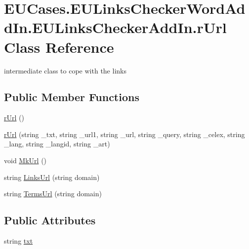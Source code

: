 \hypertarget{class_e_u_cases_1_1_e_u_links_checker_word_add_in_1_1_e_u_links_checker_add_in_1_1r_url}{\section{E\+U\+Cases.\+E\+U\+Links\+Checker\+Word\+Add\+In.\+E\+U\+Links\+Checker\+Add\+In.\+r\+Url Class Reference}
\label{class_e_u_cases_1_1_e_u_links_checker_word_add_in_1_1_e_u_links_checker_add_in_1_1r_url}
}


intermediate class to cope with the links  


\subsection*{Public Member Functions}
\begin{DoxyCompactItemize}
\item 
\hyperlink{class_e_u_cases_1_1_e_u_links_checker_word_add_in_1_1_e_u_links_checker_add_in_1_1r_url_a6ef738c877d82dde9364d29a1fd4087f}{r\+Url} ()
\item 
\hyperlink{class_e_u_cases_1_1_e_u_links_checker_word_add_in_1_1_e_u_links_checker_add_in_1_1r_url_a580cd303bcdb34d8230c37b81e971cfa}{r\+Url} (string \+\_\+txt, string \+\_\+url1, string \+\_\+url, string \+\_\+query, string \+\_\+celex, string \+\_\+lang, string \+\_\+langid, string \+\_\+art)
\item 
void \hyperlink{class_e_u_cases_1_1_e_u_links_checker_word_add_in_1_1_e_u_links_checker_add_in_1_1r_url_ac19eff0c4d6fe4dedb2f062324248340}{Mk\+Url} ()
\item 
string \hyperlink{class_e_u_cases_1_1_e_u_links_checker_word_add_in_1_1_e_u_links_checker_add_in_1_1r_url_a81a72ef87c9b1598e11fc6b0e6d3b41b}{Links\+Url} (string domain)
\item 
string \hyperlink{class_e_u_cases_1_1_e_u_links_checker_word_add_in_1_1_e_u_links_checker_add_in_1_1r_url_a99a9835efe43f2ef82a14742d03e6b0e}{Terms\+Url} (string domain)
\end{DoxyCompactItemize}
\subsection*{Public Attributes}
\begin{DoxyCompactItemize}
\item 
string \hyperlink{class_e_u_cases_1_1_e_u_links_checker_word_add_in_1_1_e_u_links_checker_add_in_1_1r_url_ac506a702d48d6b4e64d23815c3c546b9}{txt}
\end{DoxyCompactItemize}
